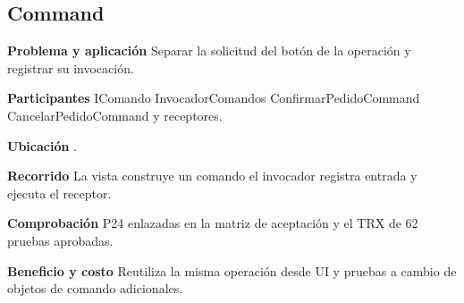 \noindent\begin{minipage}{\linewidth}
\subsection{Command}
\textbf{Problema y aplicación} Separar la solicitud del botón de la operación y registrar su invocación.

\textbf{Participantes} IComando InvocadorComandos ConfirmarPedidoCommand CancelarPedidoCommand y receptores.

\textbf{Ubicación} \href{https://github.com/Alan77-bot/LogiMarket360Alan/blob/68bda51063441415524ede51bdf61649ee9b4973/LogiMarket.Application/Comandos/InvocadorComandos.cs#L8}{}.

\textbf{Recorrido} La vista construye un comando el invocador registra entrada y ejecuta el receptor.


\textbf{Comprobación} P24 enlazadas en la matriz de aceptación y el TRX de 62 pruebas aprobadas.

\textbf{Beneficio y costo} Reutiliza la misma operación desde UI y pruebas a cambio de objetos de comando adicionales.

\end{minipage}\par\smallskip
